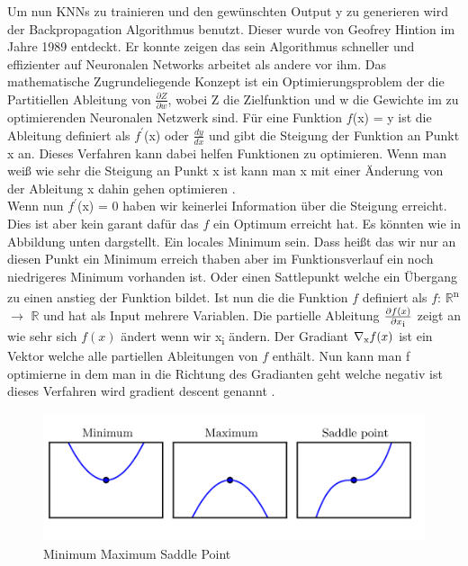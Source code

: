 \documentclass{llncs}
\begin{document}
Um nun KNNs zu trainieren und den gewünschten Output y zu generieren wird der Backpropagation Algorithmus benutzt. Dieser wurde von Geofrey Hintion im Jahre 1989 entdeckt\cite{backpro}. Er konnte zeigen das sein Algorithmus schneller und effizienter auf Neuronalen Networks arbeitet als andere vor ihm. Das mathematische Zugrundeliegende Konzept ist ein Optimierungsproblem der die Partitiellen Ableitung von  $\frac{\partial Z}{\partial w}$, wobei Z die Zielfunktion und w die Gewichte im zu optimierenden Neuronalen Netzwerk sind. Für eine Funktion $f$(x) = y ist die Ableitung definiert als $f^\prime$(x) oder $\frac{dy}{dx}$ und gibt die Steigung der Funktion an Punkt x an. Dieses Verfahren kann dabei helfen Funktionen zu optimieren. Wenn man weiß wie sehr die Steigung an Punkt x ist kann man x mit einer Änderung von der Ableitung x dahin gehen optimieren \cite{Grundlagen}. \\


Wenn nun $f^\prime$(x) = 0 haben wir keinerlei Information über die Steigung erreicht. Dies ist aber kein garant dafür das $f$ ein Optimum erreicht hat.  Es könnten wie in Abbildung unten dargstellt. Ein locales Minimum sein. Dass heißt das wir nur an diesen Punkt ein Minimum erreich thaben aber im Funktionsverlauf ein noch niedrigeres Minimum vorhanden ist. Oder einen Sattlepunkt welche ein Übergang zu einen anstieg der Funktion bildet.
Ist nun die die Funktion $f$ definiert als $f$: $\mathbb{R}$\textsuperscript{n} $\rightarrow$  $\mathbb{R}$ und hat als Input mehrere Variablen. Die partielle Ableitung $\frac{\partial f(x)}{\partial x\textsubscript{i}}$ zeigt an wie sehr sich $f(x)$ ändert wenn wir x\textsubscript{i} ändern. Der Gradiant $\nabla\textsubscript{x}f(x)$ ist ein Vektor welche alle partiellen Ableitungen von $f$ enthält. Nun kann man f optimierne in dem man in die Richtung des Gradianten geht welche negativ ist dieses Verfahren wird gradient descent genannt \cite{Grundlagen}.
\begin{figure}[htbp] 
	\centering
	\includegraphics[width=1.0\textwidth]{saddle.png}
	\caption{Minimum Maximum Saddle Point}
	\label{fig:Bild5}
\end{figure}
\end{document}

